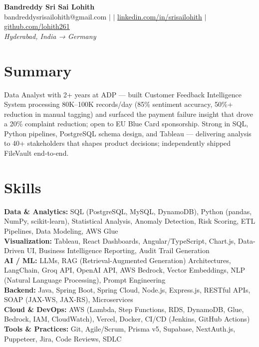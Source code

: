 \documentclass[10pt,letterpaper]{article}
\newcommand{\skillrow}[2]{\textbf{#1:} #2 \\[1pt]}
\begin{document}
\begin{center}
  {\Huge\bfseries Bandreddy Sri Sai Lohith}\\[3pt]
  \small bandreddysrisailohith@gmail.com $\vert$ $\vert$\; \href{https://linkedin.com/in/srisailohith}{linkedin.com/in/srisailohith} $\vert$\; \href{https://github.com/lohith261}{github.com/lohith261} \\[2pt]
  \small\textit{Hyderabad, India → Germany}
\end{center}

\section{Summary}

Data Analyst with 2+ years at ADP --- built Customer Feedback Intelligence System processing 80K--100K records/day (85\% sentiment accuracy, 50\%+ reduction in manual tagging) and surfaced the payment failure insight that drove a 20\% complaint reduction; open to EU Blue Card sponsorship.
      Strong in SQL, Python pipelines, PostgreSQL schema design, and Tableau --- delivering analysis to 40+ stakeholders that shapes product decisions; independently shipped FileVault end-to-end.

\section{Skills}

\skillrow{Data \& Analytics}{SQL (PostgreSQL, MySQL, DynamoDB), Python (pandas, NumPy, scikit-learn), Statistical Analysis, Anomaly Detection, Risk Scoring, ETL Pipelines, Data Modeling, AWS Glue}
\skillrow{Visualization}{Tableau, React Dashboards, Angular/TypeScript, Chart.js, Data-Driven UI, Business Intelligence Reporting, Audit Trail Generation}
\skillrow{AI / ML}{LLMs, RAG (Retrieval-Augmented Generation) Architectures, LangChain, Groq API, OpenAI API, AWS Bedrock, Vector Embeddings, NLP (Natural Language Processing), Prompt Engineering}
\skillrow{Backend}{Java, Spring Boot, Spring Cloud, Node.js, Express.js, RESTful APIs, SOAP (JAX-WS, JAX-RS), Microservices}
\skillrow{Cloud \& DevOps}{AWS (Lambda, Step Functions, RDS, DynamoDB, Glue, Bedrock, IAM, CloudWatch), Vercel, Docker, CI/CD (Jenkins, GitHub Actions)}
\skillrow{Tools \& Practices}{Git, Agile/Scrum, Prisma v5, Supabase, NextAuth.js, Puppeteer, Jira, Code Reviews, SDLC}
\end{document}
